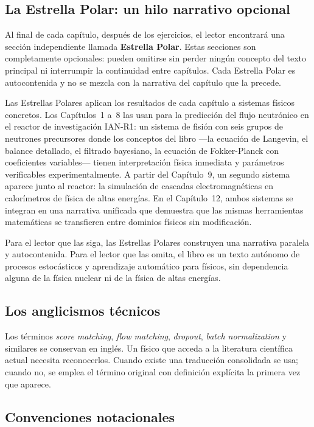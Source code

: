 \subsection*{La Estrella Polar: un hilo narrativo opcional}

Al final de cada capítulo, después de los ejercicios, el lector encontrará
una sección independiente llamada \textbf{Estrella Polar}. Estas secciones
son completamente opcionales: pueden omitirse sin perder ningún concepto del
texto principal ni interrumpir la continuidad entre capítulos. Cada Estrella
Polar es autocontenida y no se mezcla con la narrativa del capítulo que la
precede.

Las Estrellas Polares aplican los resultados de cada capítulo a sistemas
físicos concretos. Los Capítulos~1 a~8 las usan para la predicción del
flujo neutrónico en el reactor de investigación IAN-R1: un sistema de fisión
con seis grupos de neutrones precursores donde los conceptos del libro ---la
ecuación de Langevin, el balance detallado, el filtrado bayesiano, la
ecuación de Fokker-Planck con coeficientes variables--- tienen
interpretación física inmediata y parámetros verificables
experimentalmente. A partir del Capítulo~9, un segundo sistema aparece
junto al reactor: la simulación de cascadas electromagnéticas en
calorímetros de física de altas energías. En el Capítulo~12, ambos
sistemas se integran en una narrativa unificada que demuestra que las
mismas herramientas matemáticas se transfieren entre dominios físicos sin
modificación.

Para el lector que las siga, las Estrellas Polares construyen una narrativa
paralela y autocontenida. Para el lector que las omita, el libro es un
texto autónomo de procesos estocásticos y aprendizaje automático para
físicos, sin dependencia alguna de la física nuclear ni de la física de
altas energías.

\subsection*{Los anglicismos técnicos}

Los términos \textit{score matching}, \textit{flow matching},
\textit{dropout}, \textit{batch normalization} y similares se conservan
en inglés. Un físico que acceda a la literatura científica actual necesita
reconocerlos. Cuando existe una traducción consolidada se usa; cuando no,
se emplea el término original con definición explícita la primera vez que
aparece.

\subsection*{Convenciones notacionales}

